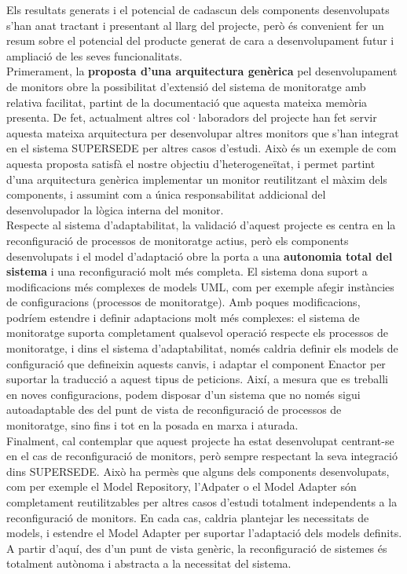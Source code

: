 Els resultats generats i el potencial de cadascun dels components desenvolupats s'han anat tractant i presentant al llarg del projecte, però és convenient fer un resum sobre el potencial del producte generat de cara a desenvolupament futur i ampliació de les seves funcionalitats.\\

Primerament, la \textbf{proposta d'una arquitectura genèrica} pel desenvolupament de monitors obre la possibilitat d'extensió del sistema de monitoratge amb relativa facilitat, partint de la documentació que aquesta mateixa memòria presenta. De fet, actualment altres col·laboradors del projecte han fet servir aquesta mateixa arquitectura per desenvolupar altres monitors que s'han integrat en el sistema SUPERSEDE per altres casos d'estudi. Això és un exemple de com aquesta proposta satisfà el nostre objectiu d'heterogeneïtat, i permet partint d'una arquitectura genèrica implementar un monitor reutilitzant el màxim dels components, i assumint com a única responsabilitat addicional del desenvolupador la lògica interna del monitor.\\

Respecte al sistema d'adaptabilitat, la validació d'aquest projecte es centra en la reconfiguració de processos de monitoratge actius, però els components desenvolupats i el model d'adaptació obre la porta a una \textbf{autonomia total del sistema} i una reconfiguració molt més completa. El sistema dona suport a modificacions més complexes de models UML, com per exemple afegir instàncies de configuracions (processos de monitoratge). Amb poques modificacions, podríem estendre i definir adaptacions molt més complexes: el sistema de monitoratge suporta completament qualsevol operació respecte els processos de monitoratge, i dins el sistema d'adaptabilitat, només caldria definir els models de configuració que defineixin aquests canvis, i adaptar el component Enactor per suportar la traducció a aquest tipus de peticions. Així, a mesura que es treballi en noves configuracions, podem disposar d'un sistema que no només sigui autoadaptable des del punt de vista de reconfiguració de processos de monitoratge, sino fins i tot en la posada en marxa i aturada.\\

Finalment, cal contemplar que aquest projecte ha estat desenvolupat centrant-se en el cas de reconfiguració de monitors, però sempre respectant la seva integració dins SUPERSEDE. Això ha permès que alguns dels components desenvolupats, com per exemple el Model Repository, l'Adpater o el Model Adapter són completament reutilitzables per altres casos d'estudi totalment independents a la reconfiguració de monitors. En cada cas, caldria plantejar les necessitats de models, i estendre el Model Adapter per suportar l'adaptació dels models definits. A partir d'aquí, des d'un punt de vista genèric, la reconfiguració de sistemes és totalment autònoma i abstracta a la necessitat del sistema.

